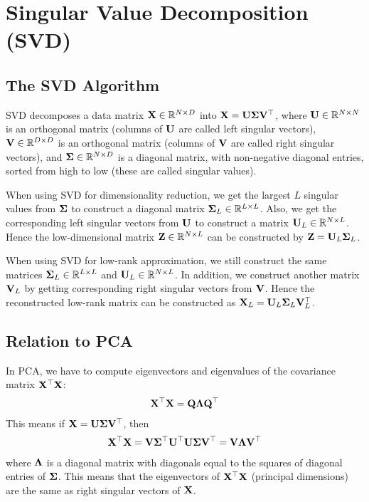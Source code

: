 \section{Singular Value Decomposition (SVD)}
\label{section4.2}

\subsection{The SVD Algorithm}

SVD decomposes a data matrix $\mathbf{X}\in\mathbb{R}^{N\times D}$ into $\mathbf{X}=\mathbf{U}\mathbf{\Sigma}\mathbf{V}{}^\top$, where $\mathbf{U}\in\mathbb{R}^{N\times N}$ is an orthogonal matrix (columns of $\mathbf{U}$ are called left singular vectors), $\mathbf{V}\in\mathbb{R}^{D\times D}$ is an orthogonal matrix (columns of $\mathbf{V}$ are called right singular vectors), and $\mathbf{\Sigma}\in\mathbb{R}^{N\times D}$ is a diagonal matrix, with non-negative diagonal entries, sorted from high to low (these are called singular values).

When using SVD for dimensionality reduction, we get the largest $L$ singular values from $\mathbf{\Sigma}$ to construct a diagonal matrix $\mathbf{\Sigma}_L\in\mathbb{R}^{L\times L}$. Also, we get the corresponding left singular vectors from $\mathbf{U}$ to construct a matrix $\mathbf{U}_L\in\mathbb{R}^{N\times L}$. Hence the low-dimensional matrix $\mathbf{Z}\in\mathbb{R}^{N\times L}$ can be constructed by $\mathbf{Z}=\mathbf{U}_L\mathbf{\Sigma}_L$.

When using SVD for low-rank approximation, we still construct the same matrices $\mathbf{\Sigma}_L\in\mathbb{R}^{L\times L}$ and $\mathbf{U}_L\in\mathbb{R}^{N\times L}$. In addition, we construct another matrix $\mathbf{V}_L$ by getting corresponding right singular vectors from $\mathbf{V}$. Hence the reconstructed low-rank matrix can be constructed as $\mathbf{X}_L=\mathbf{U}_L\mathbf{\Sigma}_L\mathbf{V}_L^\top$.

\subsection{Relation to PCA}

In PCA, we have to compute eigenvectors and eigenvalues of the covariance matrix $\mathbf{X}{}^\top\mathbf{X}$:
\begin{align*}
	\mathbf{X}{}^\top\mathbf{X}=\mathbf{Q}\mathbf{\Lambda}\mathbf{Q}{}^\top
\end{align*}
This means if $\mathbf{X}=\mathbf{U}\mathbf{\Sigma}\mathbf{V}{}^\top$, then
\begin{align*}
	\mathbf{X}{}^\top\mathbf{X}=\mathbf{V}\mathbf{\Sigma}{}^\top\mathbf{U}{}^\top\mathbf{U}\mathbf{\Sigma}\mathbf{V}{}^\top=\mathbf{V}\mathbf{\Lambda}\mathbf{V}{}^\top
\end{align*}
where $\mathbf{\Lambda}$ is a diagonal matrix with diagonals equal to the squares of diagonal entries of $\mathbf{\Sigma}$. This means that the eigenvectors of $\mathbf{X}{}^\top\mathbf{X}$ (principal dimensions) are the same as right singular vectors of $\mathbf{X}$.



